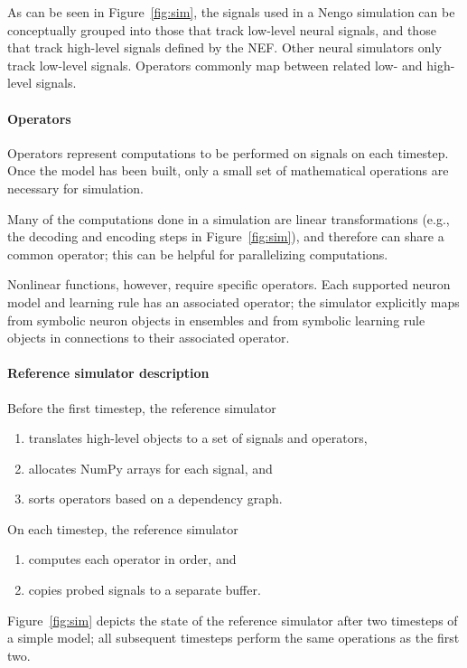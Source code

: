 \documentclass{frontiersSCNS}
\begin{document}
As can be seen in Figure~\ref{fig:sim},
the signals used in a Nengo simulation
can be conceptually grouped into
those that track low-level neural signals,
and those that track high-level signals
defined by the NEF.
Other neural simulators only track
low-level signals.
Operators commonly map
between related low- and high-level signals.

\paragraph{Operators}

Operators represent computations
to be performed on signals on each timestep.
Once the model has been built,
only a small set of mathematical
operations are necessary for simulation.

Many of the computations
done in a simulation
are linear transformations (e.g.,
the decoding and encoding steps
in Figure~\ref{fig:sim}),
and therefore can share a common operator;
this can be helpful for parallelizing computations.

Nonlinear functions, however,
require specific operators.
Each supported neuron model and learning rule
has an associated operator;
the simulator explicitly maps
from symbolic neuron objects in ensembles
and from symbolic learning rule objects
in connections to their associated operator.

\paragraph{Reference simulator description}

Before the first timestep, the reference simulator
\begin{enumerate}
  \item translates high-level objects to
    a set of signals and operators,
  \item allocates NumPy arrays for each signal, and
  \item sorts operators based on a dependency graph.
\end{enumerate}
On each timestep, the reference simulator
\begin{enumerate}
  \item computes each operator in order, and
  \item copies probed signals to a separate buffer.
\end{enumerate}
Figure~\ref{fig:sim} depicts
the state of the reference simulator
after two timesteps of a simple model;
all subsequent timesteps perform the same
operations as the first two.
\end{document}
